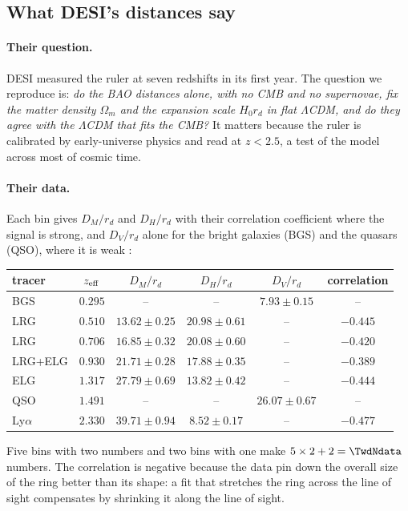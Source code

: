 \subsection{What DESI's distances say}

\paragraph{Their question.} DESI measured the ruler at seven redshifts in its first year. The question we reproduce is: \emph{do the BAO distances alone, with no CMB and no supernovae, fix the matter density $\Omega_m$ and the expansion scale $H_0r_d$ in flat $\Lambda$CDM, and do they agree with the $\Lambda$CDM that fits the CMB?} It matters because the ruler is calibrated by early-universe physics and read at $z<2.5$, a test of the model across most of cosmic time.

\paragraph{Their data.} Each bin gives $D_M/r_d$ and $D_H/r_d$ with their correlation coefficient where the signal is strong, and $D_V/r_d$ alone for the bright galaxies (BGS) and the quasars (QSO), where it is weak \cite[Table~1]{DESI2024VI}:
\begin{center}
\small
\begin{tabular}{@{}lccccc@{}}
\toprule
tracer & $z_{\rm eff}$ & $D_M/r_d$ & $D_H/r_d$ & $D_V/r_d$ & correlation\\
\midrule
BGS & $0.295$ & -- & -- & $7.93\pm0.15$ & --\\
LRG & $0.510$ & $13.62\pm0.25$ & $20.98\pm0.61$ & -- & $-0.445$\\
LRG & $0.706$ & $16.85\pm0.32$ & $20.08\pm0.60$ & -- & $-0.420$\\
LRG+ELG & $0.930$ & $21.71\pm0.28$ & $17.88\pm0.35$ & -- & $-0.389$\\
ELG & $1.317$ & $27.79\pm0.69$ & $13.82\pm0.42$ & -- & $-0.444$\\
QSO & $1.491$ & -- & -- & $26.07\pm0.67$ & --\\
Ly$\alpha$ & $2.330$ & $39.71\pm0.94$ & $8.52\pm0.17$ & -- & $-0.477$\\
\bottomrule
\end{tabular}
\end{center}
Five bins with two numbers and two bins with one make $5\times2+2=\TwdNdata$ numbers. The correlation is negative because the data pin down the overall size of the ring better than its shape: a fit that stretches the ring across the line of sight compensates by shrinking it along the line of sight.

